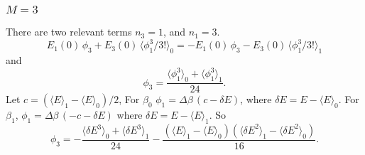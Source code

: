 \documentclass[aip,jcp,preprint,notitlepage, superscriptaddress]{revtex4-1}
\begin{document}
\subsubsection{$M = 3$}



There are two relevant terms
$n_3 = 1$,
and $n_1 = 3$.
%
\[
E_1(0) \, \phi_3
+
E_3(0) \, \langle \phi_1^3 /3! \rangle_0
=
-E_1(0) \, \phi_3
-
E_3(0) \, \langle \phi_1^3 /3! \rangle_1
\]
and
\[
\phi_3
=
\frac{
\langle \phi_1^3 \rangle_0
+
\langle \phi_1^3 \rangle_1
}{24}.
\]
%
Let
$c = \left( \langle E \rangle_1 - \langle E \rangle_0 \right) / 2$,
For $\beta_0$
$\phi_1 = \Delta \beta \, (c - \delta E)$,
where
$\delta E = E - \langle E \rangle_0$.
%
For $\beta_1$,
$\phi_1 = \Delta \beta \, (-c -\delta E)$
where
$\delta E = E - \langle E \rangle_1$.
%
So
\[
\phi_3
=
-
\frac{
\langle \delta E^3 \rangle_0
+
\langle \delta E^3 \rangle_1
}{24}
-
\frac{
  \left(
    \langle E \rangle_1
    -
    \langle E \rangle_0
  \right)
  \left(
    \langle \delta E^2 \rangle_1
    -
    \langle \delta E^2 \rangle_0
  \right)
}{16}.
\]






\end{document}
